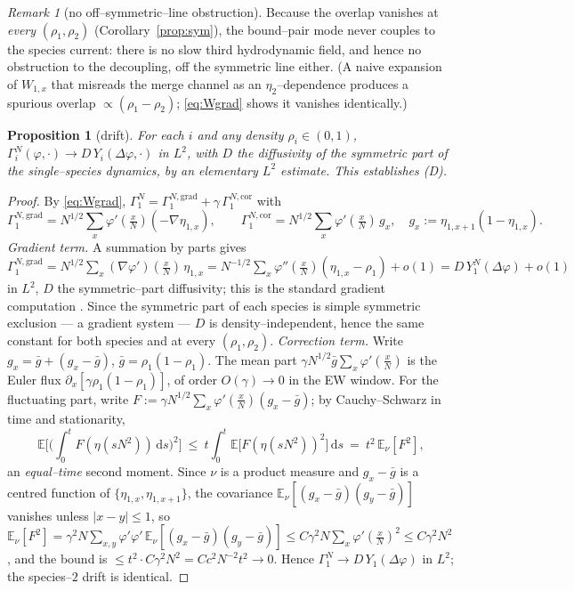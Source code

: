 \documentclass[11pt]{article}
\theoremstyle{plain}
\newtheorem{proposition}[theorem]{Proposition}
\theoremstyle{definition}
\theoremstyle{remark}
\newtheorem{remark}[theorem]{Remark}
\newcommand{\E}{\mathbb{E}}\newcommand{\PP}{\mathbb{P}}\newcommand{\dd}{\,\mathrm{d}}
\begin{document}
\begin{remark}[no off--symmetric--line obstruction]\label{rem:offline}
Because the overlap vanishes at \emph{every} $(\rho_1,\rho_2)$ (Corollary~\ref{prop:sym}),
the bound--pair mode never couples to the species current: there is no slow third
hydrodynamic field, and hence no obstruction to the decoupling, off the symmetric line
either. (A naive expansion of $W_{1,x}$ that misreads
the merge channel as an $\eta_2$--dependence produces a spurious overlap
$\propto(\rho_1-\rho_2)$; \eqref{eq:Wgrad} shows it vanishes identically.)
\end{remark}

\begin{proposition}[drift]\label{prop:drift}
For each $i$ and any density $\rho_i\in(0,1)$,
$\Gamma_i^N(\varphi,\cdot)\to D\,Y_i(\Delta\varphi,\cdot)$ in $L^2$, with $D$ the
diffusivity of the symmetric part of the single--species dynamics, by an elementary
$L^2$ estimate. This establishes \textup{(D)}.
\end{proposition}
\begin{proof}
By \eqref{eq:Wgrad}, $\Gamma_1^N=\Gamma_1^{N,\mathrm{grad}}+\gamma\,\Gamma_1^{N,\mathrm{cor}}$
with
\[
  \Gamma_1^{N,\mathrm{grad}}=N^{1/2}\sum_x\varphi'(\tfrac xN)(-\nabla\eta_{1,x}),\qquad
  \Gamma_1^{N,\mathrm{cor}}=N^{1/2}\sum_x\varphi'(\tfrac xN)\,g_x,\quad g_x:=\eta_{1,x+1}(1-\eta_{1,x}).
\]
\emph{Gradient term.} A summation by parts gives
$\Gamma_1^{N,\mathrm{grad}}=N^{1/2}\sum_x(\nabla\varphi')(\tfrac xN)\,\eta_{1,x}
 =N^{-1/2}\sum_x\varphi''(\tfrac xN)(\eta_{1,x}-\rho_1)+o(1)=D\,Y_1^N(\Delta\varphi)+o(1)$
in $L^2$, $D$ the symmetric--part diffusivity; this is the standard gradient
computation \cite[Ch.~11]{KL}. Since the symmetric part of each species is simple
symmetric exclusion --- a gradient system --- $D$ is density--independent, hence the same
constant for both species and at every $(\rho_1,\rho_2)$.
\emph{Correction term.} Write $g_x=\bar g+(g_x-\bar g)$, $\bar g=\rho_1(1-\rho_1)$. The mean
part $\gamma N^{1/2}\bar g\sum_x\varphi'(\tfrac xN)$ is the Euler flux
$\partial_x[\gamma\rho_1(1-\rho_1)]$, of order $O(\gamma)\to0$ in the EW window. For the
fluctuating part, write $F:=\gamma N^{1/2}\sum_x\varphi'(\tfrac xN)(g_x-\bar g)$; by
Cauchy--Schwarz in time and stationarity,
\[
  \E\Big[\Big(\int_0^t F(\eta(sN^2))\dd s\Big)^2\Big]
  \ \le\ t\int_0^t\E\big[F(\eta(sN^2))^2\big]\dd s\ =\ t^2\,\E_\nu[F^2],
\]
an \emph{equal--time} second moment. Since $\nu$ is a product measure and $g_x-\bar g$
is a centred function of $\{\eta_{1,x},\eta_{1,x+1}\}$, the covariance
$\E_\nu[(g_x-\bar g)(g_y-\bar g)]$ vanishes unless $|x-y|\le1$, so
$\E_\nu[F^2]=\gamma^2N\sum_{x,y}\varphi'\varphi'\,\E_\nu[(g_x-\bar g)(g_y-\bar g)]
\le C\gamma^2N\sum_x\varphi'(\tfrac xN)^2\le C\gamma^2N^2$, and the bound is
$\le t^2\cdot C\gamma^2N^2=Cc^2N^{-2}t^2\to0$. Hence $\Gamma_1^N\to D\,Y_1(\Delta\varphi)$
in $L^2$; the species--$2$ drift is identical.
\end{proof}
\end{document}
